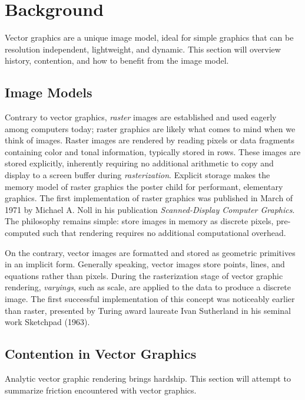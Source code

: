 \section{Background}\label{sec:background}

Vector graphics are a unique image model, ideal for simple graphics that can be resolution independent, lightweight, and dynamic. This section will overview history, contention, and how to benefit from the image model.

\subsection{Image Models}
Contrary to vector graphics, \emph{raster} images are established and used eagerly among computers today; raster graphics are likely what comes to mind when we think of images. Raster images are rendered by reading pixels or data fragments containing color and tonal information, typically stored in rows. These images are stored explicitly, inherently requiring no additional arithmetic to copy and display to a screen buffer during \emph{rasterization}. Explicit storage makes the memory model of raster graphics the poster child for performant, elementary graphics. The first implementation of raster graphics was published in March of 1971 by Michael A. Noll in his publication  \textit{Scanned-Display Computer Graphics}\cite{Noll71}. The philosophy remains simple: store images in memory as discrete pixels, pre-computed such that rendering requires no additional computational overhead.\medskip

On the contrary, vector images are formatted and stored as geometric primitives in an implicit form. Generally speaking, vector images store points, lines, and equations rather than pixels. During the rasterization stage of vector graphic rendering, \emph{varyings}, such as scale, are applied to the data to produce a discrete image. The first successful implementation of this concept was noticeably earlier than raster, presented by Turing award laureate Ivan Sutherland\cite{Sutherland88} in his seminal work Sketchpad\cite{Sutherland63} (1963).

\subsection{Contention in Vector Graphics}

Analytic vector graphic rendering brings hardship. This section will attempt to summarize friction encountered with vector graphics.

